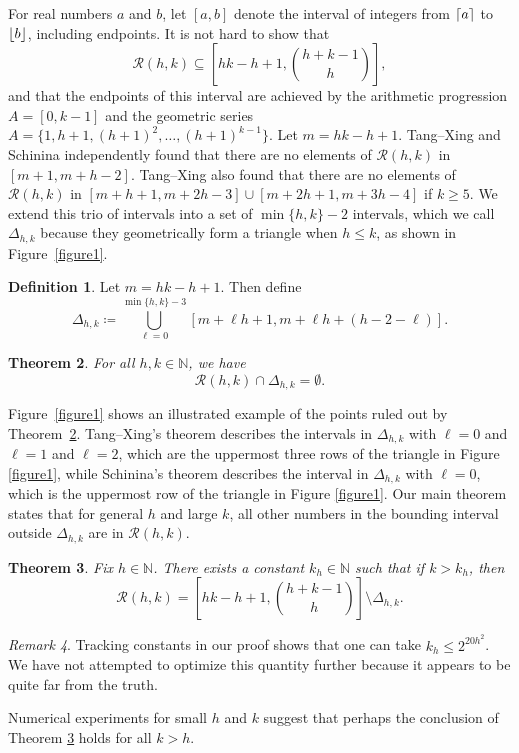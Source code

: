 \documentclass[10pt,a4paper]{article}
\newtheorem{theorem}{Theorem}
\theoremstyle{definition}
\newtheorem{definition}[theorem]{Definition}
\theoremstyle{remark}
\newtheorem{remark}[theorem]{Remark}
\numberwithin{equation}{section}
\numberwithin{theorem}{section}
\newcommand{\N}{\mathbb{N}}
\newcommand{\calr}{\mathcal{R}}
\DeclarePairedDelimiter{\ceil}{\lceil}{\rceil}
\DeclarePairedDelimiter{\floor}{\lfloor}{\rfloor}
\begin{document}
For real numbers $a$ and $b$, let $[a,b]$ denote the interval of integers from $\ceil{a}$ to $\floor{b}$, including endpoints. It is not hard to show \cite[Theorem 1.3]{Nathanson96} that \begin{equation}\label{eqtrivialbound}
    \mathcal{R}(h,k) \subseteq \left[hk-h+1,\binom{h+k-1}{h}\right],
\end{equation} and that the endpoints of this interval are achieved by the arithmetic progression $A = [0,k-1]$ and the geometric series $A = \{1,h+1,(h+1)^2,\ldots,(h+1)^{k-1}\}$.
Let $m = hk-h+1$. Tang--Xing \cite{TX19} and Schinina \cite{Schinina25} independently found that there are no elements of $\mathcal{R}(h,k)$ in $[m+1,m+h-2]$. Tang--Xing also found that there are no elements of $\mathcal{R}(h,k)$ in $[m+h+1,m+2h-3] \cup [m+2h+1,m+3h-4]$ if $k \geq 5$. We extend this trio of intervals into a set of $\min\{h,k\}-2$ intervals, which we call $\Delta_{h,k}$ because they  geometrically form a triangle when $h \leq k$, as shown in Figure~\ref{figure1}.

\begin{definition}\label{defdelta}
    Let $m = hk-h+1$. Then define 
    \[\Delta_{h,k} \coloneq  \bigcup_{\ell =0}^{\min\{h,k\}-3}[m+\ell h+1,m+\ell h+(h-2-\ell)].\]
\end{definition}
\begin{theorem}\label{mainthm} For all $h,k \in \N$, we have
    \[\mathcal{R}(h,k) \cap \Delta_{h,k} = \emptyset.\]
\end{theorem}

Figure~\ref{figure1} shows an illustrated example of the points ruled out by Theorem~\ref{mainthm}. Tang--Xing's \cite{TX19} theorem describes the intervals in $\Delta_{h,k}$ with $\ell = 0$ and $\ell = 1$ and $\ell = 2$, which are the uppermost three rows of the triangle in Figure \ref{figure1}, while Schinina's \cite{Schinina25} theorem describes the interval in $\Delta_{h,k}$ with $\ell = 0$, which is the uppermost row of the triangle in Figure \ref{figure1}. Our main theorem states that for general $h$ and large $k$, all other numbers in the bounding interval outside $\Delta_{h,k}$ are in $\calr(h,k)$.


\begin{theorem}\label{thmgeneralh}
    Fix $h \in \N$. There exists a constant $k_h \in \N$ such that if $k > k_h$, then \[\calr(h,k) = \left[hk-h+1,\binom{h+k-1}{h}\right] \setminus \Delta_{h,k}.\]
\end{theorem}

\begin{remark}\label{remarkasterisk}
Tracking constants in our proof shows that one can take $k_h \leq 2^{20h^2}$. We have not attempted to optimize this quantity further because it appears to be quite far from the truth.
\end{remark}
Numerical experiments for small $h$ and $k$ suggest that perhaps the conclusion of Theorem \ref{thmgeneralh} holds for all $k> h$. 
\end{document}
